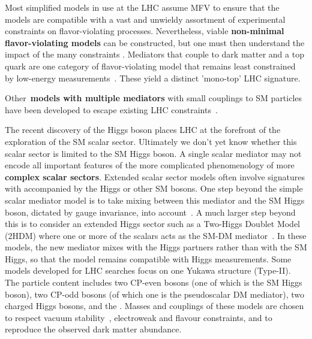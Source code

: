 Most simplified models in use at the LHC assume MFV to ensure that the models are compatible with a vast and unwieldy assortment of experimental constraints on flavor-violating processes. Nevertheless, viable \textbf{non-minimal flavor-violating models} can be constructed, but one must then understand the impact of the many constraints \cite{Blanke:2017tnb}. Mediators that couple to dark matter and a top quark are one category of flavor-violating model that remains least constrained by low-energy measurements~\cite{Boucheneb:2014wza}. These yield a distinct 'mono-top' LHC signature. 

Other~\textbf{models with multiple mediators} with small couplings to SM particles have been developed to escape existing LHC constraints~\cite{Duerr:2016tmh}. 




The recent discovery of the Higgs boson places LHC at the forefront of the exploration of the SM scalar sector. Ultimately we don't yet know whether this scalar sector is limited to the SM Higgs boson. A single scalar mediator may not encode all important features of the more complicated phenomenology of more \textbf{complex scalar sectors}. Extended scalar sector models often involve signatures with \MET accompanied by the Higgs or other SM bosons.
One step beyond the simple scalar mediator model is to take mixing between this mediator and the SM Higgs boson, dictated by gauge invariance, into account~\cite{Bauer:2016gys,Berlin:2014cfa}. 
A much larger step beyond this is to consider an extended Higgs sector such as a Two-Higgs Doublet Model (2HDM) where one or more of the scalars acts as the SM-DM mediator~\cite{Bauer:2017ota,Goncalves:2016iyg,Bell:2016ekl}. 
In these models, the new  mediator mixes with the Higgs partners rather than with the SM Higgs, so that the model remains compatible with Higgs measurements. Some models developed for LHC searches focus on one Yukawa structure (Type-II). The particle content includes two CP-even bosons (one of which is the SM Higgs boson), two CP-odd bosons (of which one is the pseudoscalar DM mediator), two charged Higgs bosons, and the \IP. Masses and couplings of these models are chosen to respect vacuum stability~\cite{Goncalves:2016iyg}, electroweak and flavour constraints, and to reproduce the observed dark matter abundance.

